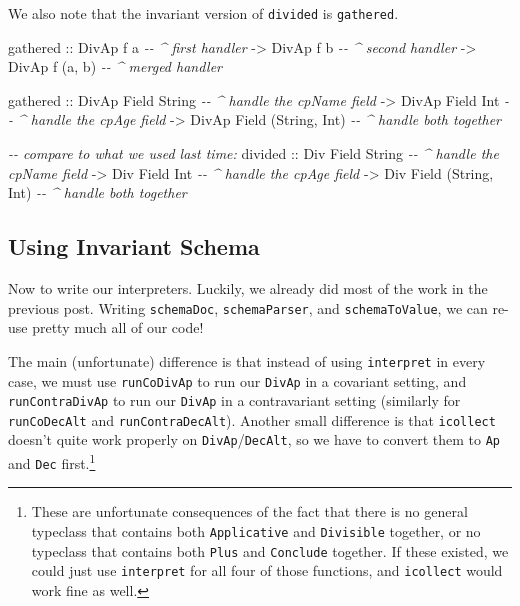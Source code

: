 \documentclass[]{article}
\newenvironment{Shaded}{}{}
\newcommand{\CommentTok}[1]{\textcolor[rgb]{0.38,0.63,0.69}{\textit{#1}}}
\newcommand{\DataTypeTok}[1]{\textcolor[rgb]{0.56,0.13,0.00}{#1}}
\newcommand{\NormalTok}[1]{#1}
\newcommand{\OtherTok}[1]{\textcolor[rgb]{0.00,0.44,0.13}{#1}}
\begin{document}
We also note that the invariant version of \texttt{divided} is
\texttt{gathered}.

\begin{Shaded}
\begin{Highlighting}[]
\NormalTok{gathered}
\OtherTok{    ::} \DataTypeTok{DivAp}\NormalTok{ f a          }\CommentTok{{-}{-} \^{} first handler}
    \OtherTok{{-}>} \DataTypeTok{DivAp}\NormalTok{ f b          }\CommentTok{{-}{-} \^{} second handler}
    \OtherTok{{-}>} \DataTypeTok{DivAp}\NormalTok{ f (a, b)     }\CommentTok{{-}{-} \^{} merged handler}

\NormalTok{gathered}
\OtherTok{    ::} \DataTypeTok{DivAp} \DataTypeTok{Field} \DataTypeTok{String}          \CommentTok{{-}{-} \^{} handle the cpName field}
    \OtherTok{{-}>} \DataTypeTok{DivAp} \DataTypeTok{Field} \DataTypeTok{Int}             \CommentTok{{-}{-} \^{} handle the cpAge field}
    \OtherTok{{-}>} \DataTypeTok{DivAp} \DataTypeTok{Field}\NormalTok{ (}\DataTypeTok{String}\NormalTok{, }\DataTypeTok{Int}\NormalTok{)   }\CommentTok{{-}{-} \^{} handle both together}

\CommentTok{{-}{-} compare to what we used last time:}
\NormalTok{divided}
\OtherTok{    ::} \DataTypeTok{Div} \DataTypeTok{Field} \DataTypeTok{String}          \CommentTok{{-}{-} \^{} handle the cpName field}
    \OtherTok{{-}>} \DataTypeTok{Div} \DataTypeTok{Field} \DataTypeTok{Int}             \CommentTok{{-}{-} \^{} handle the cpAge field}
    \OtherTok{{-}>} \DataTypeTok{Div} \DataTypeTok{Field}\NormalTok{ (}\DataTypeTok{String}\NormalTok{, }\DataTypeTok{Int}\NormalTok{)   }\CommentTok{{-}{-} \^{} handle both together}
\end{Highlighting}
\end{Shaded}

\hypertarget{using-invariant-schema}{%
\subsection{Using Invariant Schema}\label{using-invariant-schema}}

Now to write our interpreters. Luckily, we already did most of the work in the
previous post. Writing \texttt{schemaDoc}, \texttt{schemaParser}, and
\texttt{schemaToValue}, we can re-use pretty much all of our code!

The main (unfortunate) difference is that instead of using \texttt{interpret} in
every case, we must use \texttt{runCoDivAp} to run our \texttt{DivAp} in a
covariant setting, and \texttt{runContraDivAp} to run our \texttt{DivAp} in a
contravariant setting (similarly for \texttt{runCoDecAlt} and
\texttt{runContraDecAlt}). Another small difference is that \texttt{icollect}
doesn't quite work properly on \texttt{DivAp}/\texttt{DecAlt}, so we have to
convert them to \texttt{Ap} and \texttt{Dec} first.\footnote{These are
  unfortunate consequences of the fact that there is no general typeclass that
  contains both \texttt{Applicative} and \texttt{Divisible} together, or no
  typeclass that contains both \texttt{Plus} and \texttt{Conclude} together. If
  these existed, we could just use \texttt{interpret} for all four of those
  functions, and \texttt{icollect} would work fine as well.}
\end{document}
